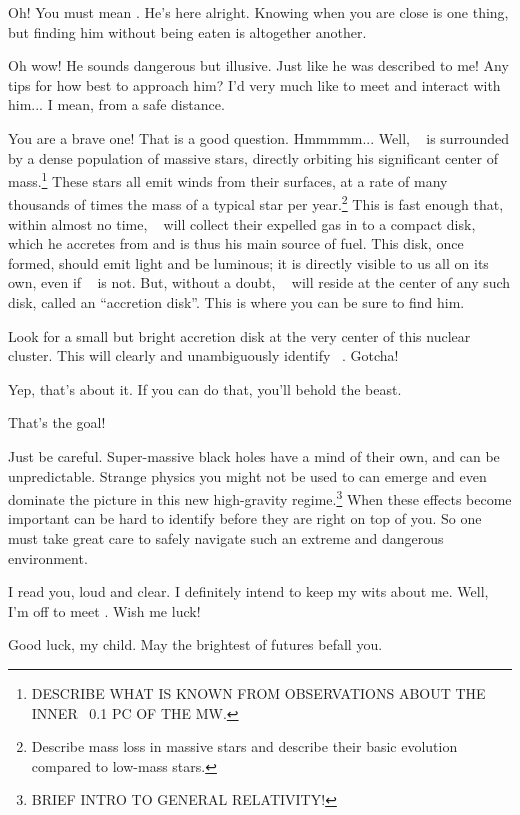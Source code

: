 \documentclass[main.tex]{subfiles}
\begin{document}
\par \Carystus Oh!  You must mean \rmchiron.  He's here alright.  Knowing when you are close is one thing, but finding him without being eaten is altogether another. 

\par \Electra Oh wow!  He sounds dangerous but illusive.  Just like he was described to me!  Any tips for how best to approach him?  I'd very much like to meet and interact with him... I mean, from a safe distance.

\par \Carystus  You are a brave one!  That is a good question.  Hmmmmm...   Well, \rmchiron~ is surrounded by a dense population of massive stars, directly orbiting his significant center of mass.\footnote{DESCRIBE WHAT IS KNOWN FROM OBSERVATIONS ABOUT THE INNER ~0.1 PC OF THE MW.}  These stars all emit winds from their surfaces, at a rate of many thousands of times the mass of a typical star per year.\footnote{Describe mass loss in massive stars and describe their basic evolution compared to low-mass stars.}  This is fast enough that, within almost no time, \rmchiron~ will collect their expelled gas in to a compact disk, which he accretes from and is thus his main source of fuel.  This disk, once formed, should emit light and be luminous; it is directly visible to us all on its own, even if \rmchiron~ is not.  But, without a doubt, \rmchiron~ will reside at the center of any such disk, called an ``accretion disk''.  This is where you can be sure to find him.

\par \Electra  Look for a small but bright accretion disk at the very center of this nuclear cluster.  This will clearly and unambiguously identify \rmchiron~.  Gotcha!  

\par \Carystus  Yep, that's about it.  If you can do that, you'll behold the beast.  

\par \Electra That's the goal!

\par \Carystus Just be careful.  Super-massive black holes have a mind of their own, and can be unpredictable.  Strange physics you might not be used to can emerge and even dominate the picture in this new high-gravity regime.\footnote{BRIEF INTRO TO GENERAL RELATIVITY!}  When these effects become important can be hard to identify before they are right on top of you.  So one must take great care to safely navigate such an extreme and dangerous environment.

\par \Electra I read you, loud and clear.  I definitely intend to keep my wits about me.  Well, I'm off to meet \rmchiron.  Wish me luck!

\par \Carystus Good luck, my child.  May the brightest of futures befall you.
\end{document}
